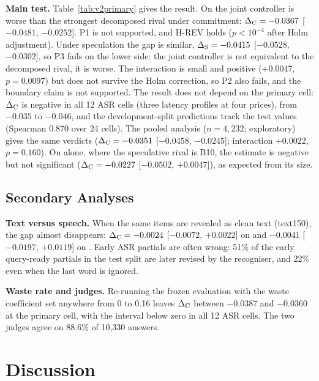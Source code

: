 \textbf{Main test.} Table~\ref{tab:v2primary} gives the result. On
 the joint controller is worse than the strongest decomposed
rival under commitment: $\Delta_{\mathrm{C}}=-0.0367$ [$-0.0481$, $-0.0252$]. P1 is not
supported, and H-REV holds ($p<10^{-4}$ after Holm adjustment). Under
speculation the gap is similar, $\Delta_{\mathrm{S}}=-0.0415$ [$-0.0528$, $-0.0302$], so P3
fails on the lower side: the joint controller is not equivalent to the
decomposed rival, it is worse. The interaction is small and positive
(+0.0047, $p=0.0097$) but does not survive the Holm correction, so P2 also
fails, and the boundary claim is not supported. The result does not depend on
the primary cell: $\Delta_{\mathrm{C}}$ is negative in all 12  ASR cells (three
latency profiles at four prices), from $-0.035$ to $-0.046$, and the
development-split predictions track the test values (Spearman 0.870 over 24
cells). The pooled analysis ($n=4{,}232$; exploratory) gives the same
verdicts ($\Delta_{\mathrm{C}}=-0.0351$ [$-0.0458$, $-0.0245$]; interaction $+0.0022$,
$p=0.160$). On
 alone, where the speculative rival is B10, the estimate is
negative but not significant ($\Delta_{\mathrm{C}}=-0.0227$ [$-0.0502$, $+0.0047$]), as
expected from its size.

\subsection{Secondary Analyses}\label{sec:res-secondary}

\textbf{Text versus speech.} When the same items are revealed as clean text
(text150), the gap almost disappears: $\Delta_{\mathrm{C}}=-0.0024$ [$-0.0072$, $+0.0022$] on
 and $-0.0041$ [$-0.0197$, $+0.0119$] on .
Early ASR partials are often wrong: 51\% of the early query-ready partials in
the  test split are later revised by the recogniser, and 22\%
even when the last word is ignored.

\textbf{Waste rate and judges.} Re-running the frozen evaluation with the
waste coefficient set anywhere from 0 to 0.16 leaves $\Delta_{\mathrm{C}}$ between $-0.0387$
and $-0.0360$ at the primary cell, with the interval below zero in all 12 ASR
cells. The two judges agree on 88.6\% of 10,330  answers.

\section{Discussion}\label{sec:discussion}

